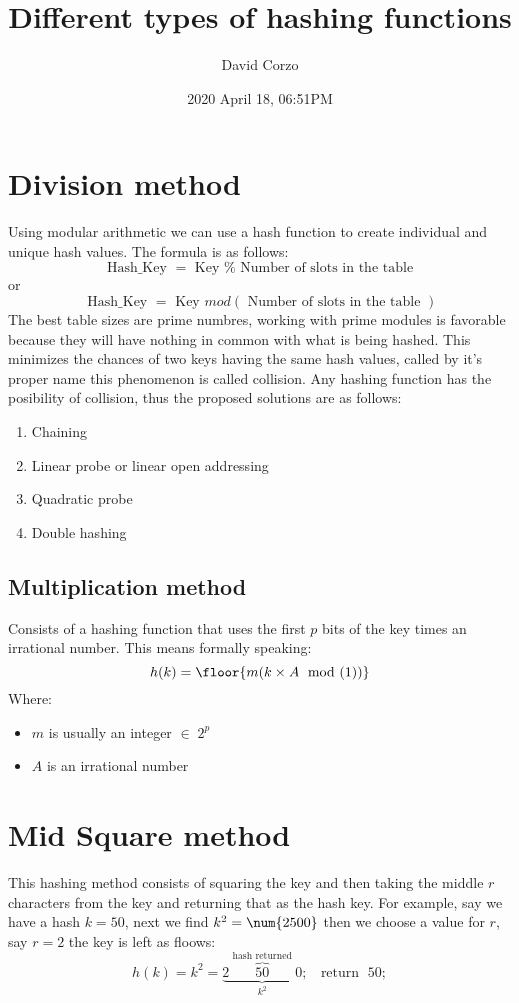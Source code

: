 \documentclass{article}
\title{Different types of hashing functions}
\date{2020 April 18, 06:51PM}
\author{David Corzo}
\begin{document}
\maketitle

\section{Division method}
Using modular arithmetic we can use a hash function to create individual and unique hash values. The formula is as follows:
\[
  \text{ Hash\_Key } = \text{ Key }\% \text{ Number of slots in the table }
\]or 
\[
    \text{ Hash\_Key } = \text{ Key } mod(\text{ Number of slots in the table })
\]
The best table sizes are prime numbres, working with prime modules is favorable because they will have nothing in common with what is being hashed. This minimizes the chances of two keys having the same hash values, called by it's proper name this phenomenon is called collision. Any hashing function has the posibility of collision, thus the proposed solutions are as follows: 
\begin{enumerate}
    \item Chaining 
    \item Linear probe or linear open addressing 
    \item Quadratic probe 
    \item Double hashing 
\end{enumerate}

\subsection{Multiplication method}
Consists of a hashing function that uses the first $p$ bits of the key times an irrational number. This means formally speaking: 
\[
  h(k) = \floor{m(k \times A \; \text{ mod }(1))}
\]Where:
\begin{itemize}
    \item $m$ is usually an integer $\in \; 2^{p}$ 
    \item $A$ is an irrational number 
\end{itemize}


\section{Mid Square method}
This hashing method consists of squaring the key and then taking the middle $r$ characters from the key and returning that as the hash key. For example, say we have a hash $k = 50$, next we find $k^2= \num{\fpeval{50^2}} $ then we choose a value for $r$, say $r=2$ the key is left as floows:
\[
  h(k) = k^2 = \underbrace{2\overbrace{50}^{\text{ hash returned }}0}_{k^2};\;\; \text{ return }\;50; 
\]
\end{document}
